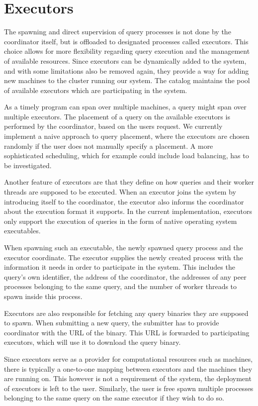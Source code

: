 \section{Executors}

The spawning and direct supervision of query processes is not done by the
coordinator itself, but is offloaded to designated processes called executors.
This choice allows for more flexibility regarding query execution and the
management of available resources. Since executors can be dynamically added
to the system, and with some limitations also be removed again, they provide
a way for adding new machines to the cluster running our system. The catalog
maintains the pool of available executors which are participating in the system.

As a timely program can span over multiple machines, a query might span
over multiple executors. The placement of a query on the available executors
is performed by the coordinator, based on the users request.
We currently implement a naive approach to query placement, where the executors
are chosen randomly if the user does not manually specify a placement. A more
sophisticated scheduling, which for example could include load balancing,
has to be investigated.

Another feature of executors are that they define on how queries and their
worker threads are supposed to be executed. When an executor joins
the system by introducing itself to the coordinator, the executor also informs
the coordinator about the execution format it supports. In the current
implementation, executors only support the execution of queries in the form of
native operating system executables.

When spawning such an executable, the newly spawned query process and the
executor coordinate. The executor supplies the newly created process with the information
it needs in order to participate in the system. This includes the query's own identifier,
the address of the coordinator, the addresses of any peer processes belonging to the 
same query, and the number of worker threads to spawn inside this process.

Executors are also responsible for fetching any query binaries they are supposed
to spawn. When submitting a new query, the submitter has to provide coordinator
with the URL of the binary. This URL is forwarded to participating executors,
which will use it to download the query binary. 

Since executors serve as a provider for computational resources such as machines,
there is typically a one-to-one mapping between executors and the machines they
are running on. This however is not a requirement of the system, the deployment of
executors is left to the user. Similarly, the user is free spawn multiple
processes belonging to the same query on the same executor if they wish to do so.

